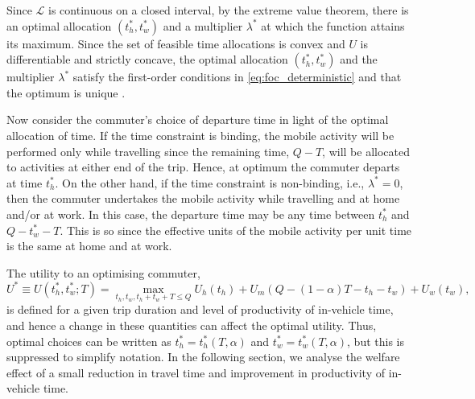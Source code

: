 \documentclass[12pt,a4paper,british]{article}
\makeatletter
\newenvironment{proof}[1][\proofname]{\par
    \normalfont\topsep6\p@\@plus6\p@\relax
    \trivlist
    \itemindent\parindent
    \item[\hskip\labelsep
          \scshape
      #1]\ignorespaces
  }{%
    \endtrivlist\@endpefalse
  }
\providecommand{\proofname}{Proof}
\makeatother
\begin{document}
\begin{proof} 
Since $\mathcal{L}$ is continuous on a closed interval, by the extreme value theorem, there is an optimal allocation $\left(t_{h}^{\ast},t_{w}^{\ast}\right)$ and a multiplier $\lambda^{\ast}$ at which the function attains its maximum. Since the set of feasible time allocations is convex and $U$ is differentiable and strictly concave, the optimal allocation  $\left(t_{h}^{\ast},t_{w}^{\ast}\right)$ and the multiplier $\lambda^{\ast} $ satisfy the first-order conditions in \eqref{eq:foc_deterministic} and that the optimum is unique \citep[Theorem 1.19 and Theorem 1.20 in][]{delaFuente2000MathematicalMethodsModels}.
\end{proof}

Now consider the commuter's choice of departure time in light of the optimal allocation of time. If the time constraint is binding, the mobile activity will be performed only while travelling since the remaining time, $Q-T$, will be allocated to activities at either end of the trip. Hence, at optimum the commuter departs at time $t_{h}^{\ast}$. On the other hand, if the time constraint is non-binding, i.e., $\lambda^{\ast}=0$, then the commuter undertakes the mobile activity while travelling and at home and/or at work. In this case, the departure time may be any time between $t_{h}^{\ast}$ and $Q-t_{w}^{\ast}-T$. This is so since the effective units of the mobile activity per unit time is the same at home and at work.
\begin{comment}
Since travel time is deterministic, there is no need for the commuter to give head start. As such the departure time can set in such a way that it is aligned with the optimal time allocation. The optimal departure time depends on whether or not the time constraint is binding. If the time constraint is binding, time at the origin and destination will be fully devoted to the home-based activity and the work-based activity, respectively, with the mobile activity being carried out only while travelling.
\end{comment}

The utility to an optimising commuter,%
\begin{equation}
U^{\ast}\equiv U\left(t_{h}^{\ast},t_{w}^{\ast};T\right)=\max_{t_{h},t_{w},t_{h}+t_{w}+T\leq Q}U_{h}\left(t_{h}\right)+U_{m}\left(Q-\left(1-\alpha\right)T-t_{h}-t_{w}\right)+U_{w}\left(t_{w}\right),
\label{eq:UStarDet}
\end{equation}
is defined for a given trip duration and level of productivity of in-vehicle time, and hence a change in these quantities can affect the optimal utility. Thus, optimal choices can be written as $t_h^{\ast}= t_h^{\ast} \left(T, \alpha \right)$ and $t_w^{\ast} = t_w^{\ast} \left(T, \alpha \right)$, but this is suppressed to simplify notation. In the following section, we analyse the welfare effect of a small reduction in travel time and improvement in productivity of in-vehicle time. %
\end{document}
